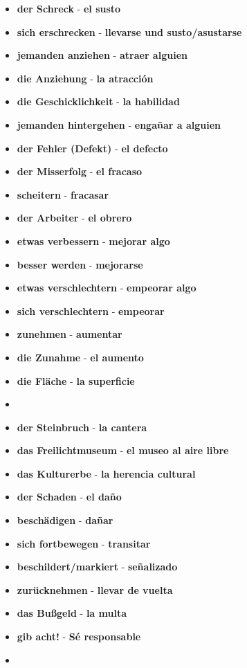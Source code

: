 \documentclass{article}
\begin{document}
\begin{multicols}{2}
\begin{itemize}
		\item{\textbf{der Schreck} - \textbf{el susto}}
		\item{\textbf{sich erschrecken} - \textbf{llevarse und susto/asustarse}}
		\item{\textbf{jemanden anziehen} - \textbf{atraer alguien}}
		\item{\textbf{die Anziehung} - \textbf{la atracción}}
		\item{\textbf{die Geschicklichkeit} - \textbf{la habilidad}}
		\item{\textbf{jemanden hintergehen} - \textbf{engañar a alguien}}
		\item{\textbf{der Fehler (Defekt)} - \textbf{el defecto}}
		\item{\textbf{der Misserfolg} - \textbf{el fracaso}}
		\item{\textbf{scheitern} - \textbf{fracasar}}
		\item{\textbf{der Arbeiter} - \textbf{el obrero}}
		\item{\textbf{etwas verbessern} - \textbf{mejorar algo}}
		\item{\textbf{besser werden} - \textbf{mejorarse}}
		\item{\textbf{etwas verschlechtern} - \textbf{empeorar algo}}
		\item{\textbf{sich verschlechtern} - \textbf{empeorar}}
		\item{\textbf{zunehmen} - \textbf{aumentar}}
		\item{\textbf{die Zunahme} - \textbf{el aumento}}
	\end{itemize}
	\newpage
	\begin{itemize}
		\item{\textbf{die Fläche} - \textbf{la superficie}}
		\item{\textbf{}}
		\item{\textbf{der Steinbruch} - \textbf{la cantera}}
		\item{\textbf{das Freilichtmuseum} - \textbf{el museo al aire libre}}
		\item{\textbf{das Kulturerbe} - \textbf{la herencia cultural}}
		\item{\textbf{der Schaden} - \textbf{el daño}}
		\item{\textbf{beschädigen} - \textbf{dañar}}
		\item{\textbf{sich fortbewegen} - \textbf{transitar}}
		\item{\textbf{beschildert/markiert} - \textbf{señalizado}}
		\item{\textbf{zurücknehmen} - \textbf{llevar de vuelta}}
		\item{\textbf{das Bußgeld} - \textbf{la multa}}
		\item{\textbf{gib acht!} - \textbf{Sé responsable}}
		\item{\textbf{}}
	\end{itemize}
	
		\end{multicols}
	
\end{document}
